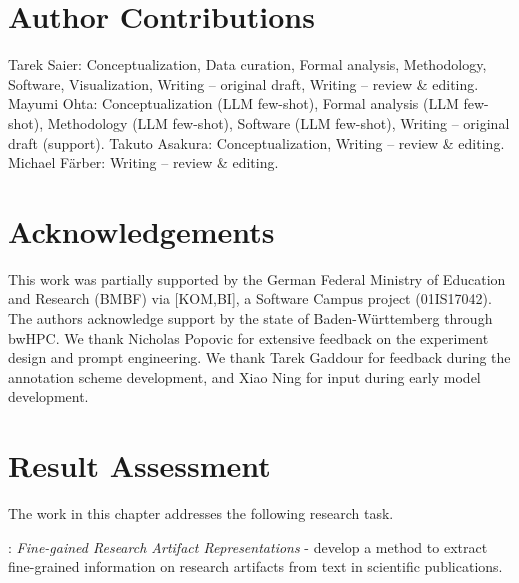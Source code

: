 

\section*{Author Contributions}  %
Tarek Saier: Conceptualization, Data curation, Formal analysis, Methodology, Software, Visualization, Writing -- original draft, Writing -- review \& editing. Mayumi Ohta: Conceptualization (LLM few-shot), Formal analysis (LLM few-shot), Methodology (LLM few-shot), Software (LLM few-shot), Writing -- original draft (support). Takuto Asakura: Conceptualization, Writing -- review \& editing. Michael F{\"a}rber: Writing -- review \& editing.

\section*{Acknowledgements}
This work was partially supported by the German Federal Ministry of Education and Research (BMBF) via [KOM,BI], a Software Campus project (01IS17042).
The authors acknowledge support by the state of Baden-W{\"u}rttemberg through bwHPC.
We thank Nicholas Popovic for extensive feedback on the experiment design and prompt engineering. We thank Tarek Gaddour for feedback during the annotation scheme development, and Xiao Ning for input during early model development.

\section{Result Assessment}
\label{sec:hypepie-assessment}

The work in this chapter addresses the following research task.

\begin{rtlist}
    \item[\rtmark{4}:] \textit{Fine-gained Research Artifact Representations} - develop a method to extract fine-grained information on research artifacts from text in scientific publications.
\end{rtlist}

